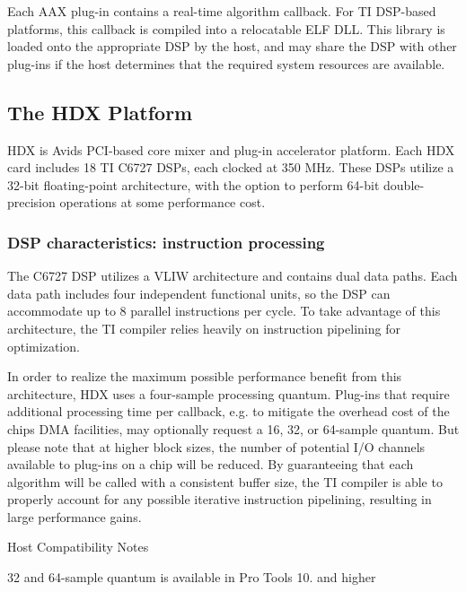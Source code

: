 Each A\+A\+X plug-\/in contains a real-\/time algorithm callback. For T\+I D\+S\+P-\/based platforms, this callback is compiled into a relocatable E\+L\+F D\+L\+L. This library is loaded onto the appropriate D\+S\+P by the host, and may share the D\+S\+P with other plug-\/ins if the host determines that the required system resources are available. 

 \hypertarget{a00362_aax_ti_guide_01_the_hdx_platform}{}\subsection{The H\+D\+X Platform}\label{a00362_aax_ti_guide_01_the_hdx_platform}
H\+D\+X is Avid\textquotesingle{}s P\+C\+I-\/based core mixer and plug-\/in accelerator platform. Each H\+D\+X card includes 18 T\+I C6727 D\+S\+Ps, each clocked at 350 M\+Hz. These D\+S\+Ps utilize a 32-\/bit floating-\/point architecture, with the option to perform 64-\/bit double-\/precision operations at some performance cost.

\hypertarget{a00362_subsection__dsp_characteristics_instruction_processing}{}\subsubsection{D\+S\+P characteristics\+: instruction processing}\label{a00362_subsection__dsp_characteristics_instruction_processing}
 The C6727 D\+S\+P utilizes a V\+L\+I\+W architecture and contains dual data paths. Each data path includes four independent functional units, so the D\+S\+P can accommodate up to 8 parallel instructions per cycle. To take advantage of this architecture, the T\+I compiler relies heavily on instruction pipelining for optimization.

In order to realize the maximum possible performance benefit from this architecture, H\+D\+X uses a four-\/sample processing quantum. Plug-\/ins that require additional processing time per callback, e.\+g. to mitigate the overhead cost of the chip\textquotesingle{}s D\+M\+A facilities, may optionally request a 16, 32, or 64-\/sample quantum. But please note that at higher block sizes, the number of potential I/\+O channels available to plug-\/ins on a chip will be reduced. By guaranteeing that each algorithm will be called with a consistent buffer size, the T\+I compiler is able to properly account for any possible iterative instruction pipelining, resulting in large performance gains.

\begin{DoxyRefDesc}{Host Compatibility Notes}
\item[\hyperlink{a00380__compatibility_notes000020}{Host Compatibility Notes}]32 and 64-\/sample quantum is available in Pro Tools 10. and higher\end{DoxyRefDesc}


